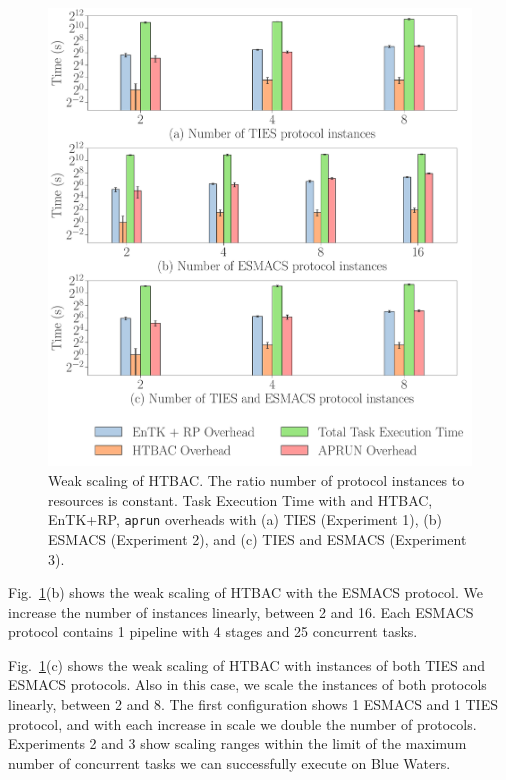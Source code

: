 \begin{figure}
  \centering
    \includegraphics[width=\columnwidth]{figures/ws_all_base2.pdf}
    \caption{Weak scaling of HTBAC. The ratio number of protocol instances to
    resources is constant. Task Execution Time with and HTBAC, EnTK+RP,
    \texttt{aprun} overheads with (a) TIES (Experiment 1), (b) ESMACS
    (Experiment 2), and (c) TIES and ESMACS (Experiment 3).}\label{fig:ws}
\up{}
\up{}
\up{}
\end{figure}

Fig.~\ref{fig:ws}(b) shows the weak scaling of HTBAC with the ESMACS
protocol. We increase the number of instances linearly, between 2 and 16.
Each ESMACS protocol contains 1 pipeline with 4 stages and 25 concurrent
tasks.

Fig.~\ref{fig:ws}(c) shows the weak scaling of HTBAC with instances of both
TIES and ESMACS protocols. Also in this case, we scale the instances of both
protocols linearly, between 2 and 8. The first configuration shows 1 ESMACS
and 1 TIES protocol, and with each increase in scale we double the number of
protocols. Experiments 2 and 3 show scaling ranges within the limit of the
maximum number of concurrent tasks we can successfully execute on Blue
Waters.

